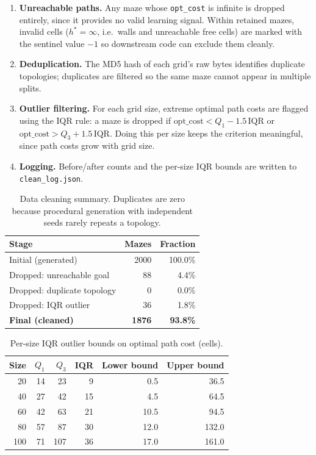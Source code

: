 \documentclass[11pt]{article}
\begin{document}
\begin{enumerate}
  \item \textbf{Unreachable paths.} Any maze whose \texttt{opt\_cost} is infinite is
  dropped entirely, since it provides no valid learning signal. Within retained mazes,
  invalid cells ($h^\ast=\infty$, i.e.\ walls and unreachable free cells) are marked with
  the sentinel value $-1$ so downstream code can exclude them cleanly.
  \item \textbf{Deduplication.} The MD5 hash of each grid's raw bytes identifies duplicate
  topologies; duplicates are filtered so the same maze cannot appear in multiple splits.
  \item \textbf{Outlier filtering.} For each grid size, extreme optimal path costs are
  flagged using the $\text{IQR}$ rule: a maze is dropped if $\text{opt\_cost} < Q_1 - 1.5\,\text{IQR}$
  or $\text{opt\_cost} > Q_3 + 1.5\,\text{IQR}$. Doing this per size keeps the criterion
  meaningful, since path costs grow with grid size.
  \item \textbf{Logging.} Before/after counts and the per-size IQR bounds are written to
  \texttt{clean\_log.json}.
\end{enumerate}

\begin{table}[H]
\centering
\caption{Data cleaning summary. Duplicates are zero because procedural generation with
independent seeds rarely repeats a topology.}
\label{tab:cleaning}
\begin{tabular}{lrr}
\toprule
Stage & Mazes & Fraction \\
\midrule
Initial (generated)          & 2000 & 100.0\% \\
Dropped: unreachable goal    & 88   & 4.4\%   \\
Dropped: duplicate topology  & 0    & 0.0\%   \\
Dropped: IQR outlier         & 36   & 1.8\%   \\
\midrule
\textbf{Final (cleaned)}     & \textbf{1876} & \textbf{93.8\%} \\
\bottomrule
\end{tabular}
\end{table}

\begin{table}[H]
\centering
\caption{Per-size IQR outlier bounds on optimal path cost (cells).}
\label{tab:iqr}
\begin{tabular}{rrrrrr}
\toprule
Size & $Q_1$ & $Q_3$ & IQR & Lower bound & Upper bound \\
\midrule
20  & 14 & 23 & 9  & 0.5  & 36.5  \\
40  & 27 & 42 & 15 & 4.5  & 64.5  \\
60  & 42 & 63 & 21 & 10.5 & 94.5  \\
80  & 57 & 87 & 30 & 12.0 & 132.0 \\
100 & 71 & 107 & 36 & 17.0 & 161.0 \\
\bottomrule
\end{tabular}
\end{table}
\end{document}
